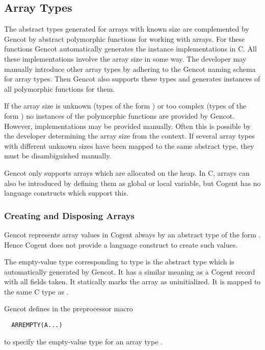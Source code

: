 \subsection{Array Types}
\label{design-operations-array}

The abstract types generated for arrays with known size are complemented by Gencot by abstract polymorphic 
functions for working with
arrays. For these functions Gencot automatically generates the instance 
implementations in C. All these implementations involve the array size in some way. The developer may manually introduce
other array types by adhering to the Gencot naming schema for array types. Then Gencot also supports these types and
generates instances of all polymorphic functions for them.

If the array size is unknown (types of the form ) or too complex (types of the form )
no instances of the polymorphic functions are provided by Gencot. However, implementations may be provided manually. Often
this is possible by the developer determining the array size from the context. If several array types with 
different unknown sizes have been mapped to the same abstract type, they must be disambiguished manually.

Gencot only supports arrays which are allocated on the heap. In C, arrays can also be introduced by defining
them as global or local variable, but Cogent has no language constructs which support this.

\subsubsection{Creating and Disposing Arrays}

Gencot represents array values in Cogent always by an abstract type of the form .
Hence Cogent does not provide a language construct to create such values. 

The empty-value type corresponding to type  is the abstract type  which
is automatically generated by Gencot. It has a similar meaning as a Cogent
record with all fields taken. It statically marks the array as uninitialized. It is mapped to the same C 
type as .

Gencot defines in  the preprocessor macro 
\begin{verbatim}
  ARREMPTY(A...)
\end{verbatim}
to specify the empty-value type for an array type .

